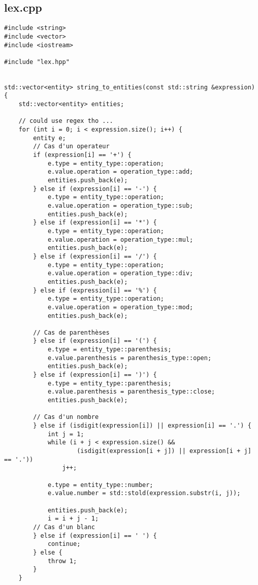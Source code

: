 \subsection{lex.cpp}
\begin{verbatim}
#include <string>
#include <vector>
#include <iostream>

#include "lex.hpp"


std::vector<entity> string_to_entities(const std::string &expression) {
    std::vector<entity> entities; 

    // could use regex tho ...
    for (int i = 0; i < expression.size(); i++) {
        entity e;
        // Cas d'un operateur
        if (expression[i] == '+') {
            e.type = entity_type::operation;
            e.value.operation = operation_type::add;
            entities.push_back(e);
        } else if (expression[i] == '-') {
            e.type = entity_type::operation;
            e.value.operation = operation_type::sub;
            entities.push_back(e);
        } else if (expression[i] == '*') {
            e.type = entity_type::operation;
            e.value.operation = operation_type::mul;
            entities.push_back(e);
        } else if (expression[i] == '/') {
            e.type = entity_type::operation;
            e.value.operation = operation_type::div;
            entities.push_back(e);
        } else if (expression[i] == '%') {
            e.type = entity_type::operation;
            e.value.operation = operation_type::mod;
            entities.push_back(e);

        // Cas de parenthèses
        } else if (expression[i] == '(') {
            e.type = entity_type::parenthesis;
            e.value.parenthesis = parenthesis_type::open;
            entities.push_back(e);
        } else if (expression[i] == ')') {
            e.type = entity_type::parenthesis;
            e.value.parenthesis = parenthesis_type::close;
            entities.push_back(e);

        // Cas d'un nombre
        } else if (isdigit(expression[i]) || expression[i] == '.') {
            int j = 1;
            while (i + j < expression.size() && 
                    (isdigit(expression[i + j]) || expression[i + j] == '.'))
                j++;

            e.type = entity_type::number;
            e.value.number = std::stold(expression.substr(i, j));

            entities.push_back(e);
            i = i + j - 1;
        // Cas d'un blanc
        } else if (expression[i] == ' ') {
            continue;
        } else {
            throw 1;
        }
    }


\end{verbatim}
